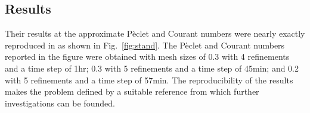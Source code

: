 \subsection{Results}
Their results at the approximate P\`{e}clet and Courant numbers were nearly exactly reproduced in \cite{musu} as shown in Fig.\ \ref{fig:stand}. The P\`{e}clet and Courant numbers reported in the figure were obtained with mesh sizes of 0.3 with 4 refinements and a time step of 1hr; 0.3 with 5 refinements and a time step of 45min; and 0.2 with 5 refinements and a time step of 57min. The reproducibility of the results makes the problem defined by \cite{schinca1} a suitable reference from which further investigations can be founded. 
\begin{figure}[!h]\footnotesize
  \begin{center}
    \hspace{0.2cm}
    \hspace{0.2cm}

\end{center}
\end{figure}
